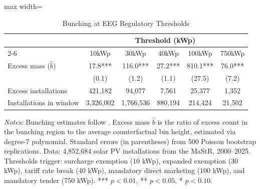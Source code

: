 \begin{table}[t]
\centering
\caption{Bunching at EEG Regulatory Thresholds}
\label{tab:main_bunching}
\begin{threeparttable}
\begin{adjustbox}{max width=\textwidth}
\begin{tabular}{lccccc}
\toprule
 & \multicolumn{5}{c}{Threshold (kWp)} \\
\cmidrule(lr){2-6}
 & 10kWp & 30kWp & 40kWp & 100kWp & 750kWp \\
\midrule
Excess mass ($\hat{b}$) & 17.8*** & 116.0*** & 27.2*** & 810.1*** & 76.0*** \\
 & (0.1) & (1.2) & (1.1) & (27.5) & (7.2) \\
Excess installations & 421,182 &  94,077 &   7,561 &  25,377 &   1,352 \\
Installations in window & 3,326,002 & 1,766,536 &   880,194 &   214,424 &    21,502 \\
\bottomrule
\end{tabular}
\end{adjustbox}
\begin{tablenotes}[flushleft]\footnotesize
\item \textit{Notes:} Bunching estimates follow \citet{Kleven2016}. Excess mass $\hat{b}$ is the ratio of excess count in the bunching region to the average counterfactual bin height, estimated via degree-7 polynomial. Standard errors (in parentheses) from 500 Poisson bootstrap replications. Data: 4,852,684 solar PV installations from the MaStR, 2000--2025. Thresholds trigger: surcharge exemption (10 kWp), expanded exemption (30 kWp), tariff rate break (40 kWp), mandatory direct marketing (100 kWp), and mandatory tender (750 kWp). *** $p<0.01$, ** $p<0.05$, * $p<0.10$.
\end{tablenotes}
\end{threeparttable}
\end{table}
